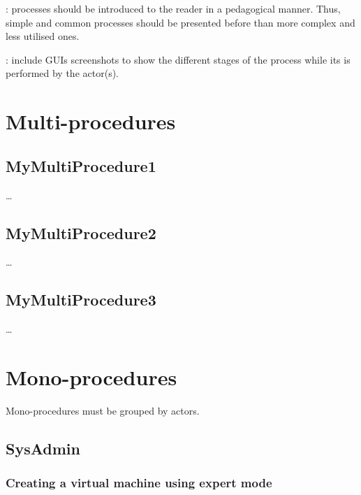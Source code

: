 : processes should be introduced to the
reader in a pedagogical manner. Thus, simple and common processes should be presented before
than more complex and less utilised ones.

: include GUIs screenshots to show the
different stages of the process while its is performed by the actor(s).






\section{Multi-procedures}


\subsection{MyMultiProcedure1}
\ldots

\subsection{MyMultiProcedure2}
\ldots


\subsection{MyMultiProcedure3}
\ldots

\section{Mono-procedures}
Mono-procedures must be grouped by actors.





\subsection{SysAdmin}

\subsubsection{Creating a virtual machine using expert mode}

